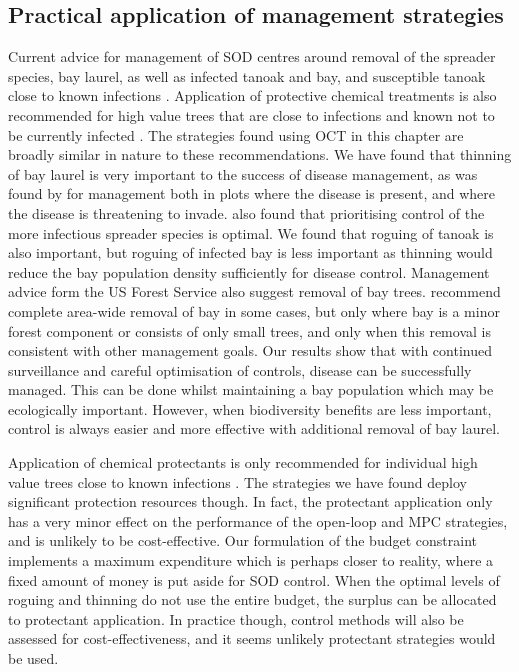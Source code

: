 \subsection{Practical application of management strategies}

Current advice for management of SOD centres around removal of the spreader species, bay laurel, as well as infected tanoak and bay, and susceptible tanoak close to known infections \citep{comtf_sudden_2014}. Application of protective chemical treatments is also recommended for high value trees that are close to infections and known not to be currently infected \citep{lee_protecting_2010}. The strategies found using OCT in this chapter are broadly similar in nature to these recommendations. We have found that thinning of bay laurel is very important to the success of disease management, as was found by \citet{cobb_resiliency_2017} for management both in plots where the disease is present, and where the disease is threatening to invade. \citet{ndeffo_mbah_optimization_2010} also found that prioritising control of the more infectious spreader species is optimal. We found that roguing of tanoak is also important, but roguing of infected bay is less important as thinning would reduce the bay population density sufficiently for disease control. Management advice form the US Forest Service \citep{swiecki_reference_2013} also suggest removal of bay trees. \citet{swiecki_reference_2013} recommend complete area-wide removal of bay in some cases, but only where bay is a minor forest component or consists of only small trees, and only when this removal is consistent with other management goals. Our results show that with continued surveillance and careful optimisation of controls, disease can be successfully managed. This can be done whilst maintaining a bay population which may be ecologically important. However, when biodiversity benefits are less important, control is always easier and more effective with additional removal of bay laurel.

Application of chemical protectants is only recommended for individual high value trees close to known infections \citep{comtf_sudden_2014}. The strategies we have found deploy significant protection resources though. In fact, the protectant application only has a very minor effect on the performance of the open-loop and MPC strategies, and is unlikely to be cost-effective. Our formulation of the budget constraint implements a maximum expenditure which is perhaps closer to reality, where a fixed amount of money is put aside for SOD control. When the optimal levels of roguing and thinning do not use the entire budget, the surplus can be allocated to protectant application. In practice though, control methods will also be assessed for cost-effectiveness, and it seems unlikely protectant strategies would be used.


